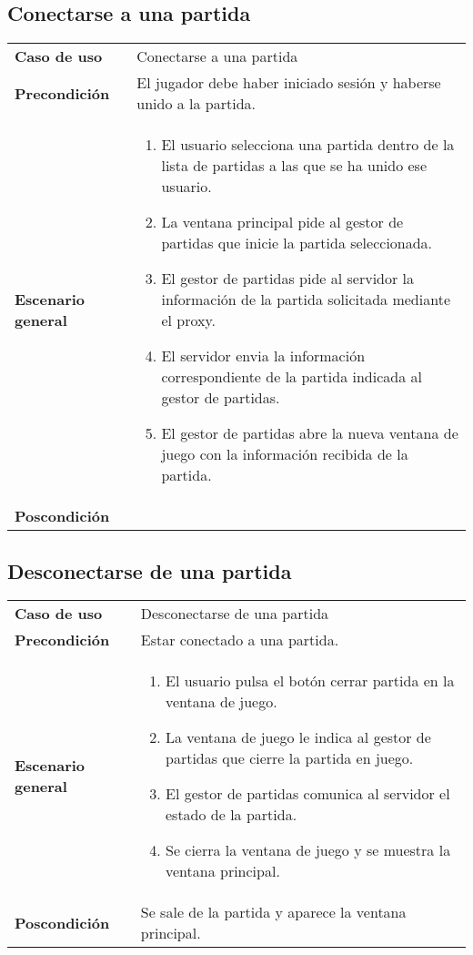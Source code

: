\subsection{Conectarse a una partida}
{\footnotesize
\begin{tabularx}{0.95\textwidth}{p{}|X}

\textbf{Caso de uso} & Conectarse a una partida \\

\textbf{Precondición} & El jugador debe haber iniciado sesión y haberse unido a
la partida.\\

\textbf{Escenario general} & \begin{enumerate}
\item El usuario selecciona una partida dentro de la lista de partidas a las que
se ha unido ese usuario.
\item La ventana principal pide al gestor de partidas que inicie la partida
seleccionada.
\item El gestor de partidas pide al servidor la información de la partida
solicitada mediante el proxy.
\item El servidor envia la información correspondiente de la partida indicada al
gestor de partidas.
\item El gestor de partidas abre la nueva ventana de juego con la información
recibida de la partida.

\end{enumerate} \\

\textbf{Poscondición}

\end{tabularx}
}

\subsection{Desconectarse de una partida}
{\footnotesize
\begin{tabularx}{0.95\textwidth}{p{}|X}

\textbf{Caso de uso} & Desconectarse de una partida \\

\textbf{Precondición} & Estar conectado a una partida.\\

\textbf{Escenario general} & \begin{enumerate}
\item El usuario pulsa el botón cerrar partida en la ventana de juego.
\item La ventana de juego le indica al gestor de partidas que cierre la partida
en juego.
\item El gestor de partidas comunica al servidor el estado de la partida.
\item Se cierra la ventana de juego y se muestra la ventana principal.

\end{enumerate} \\

\textbf{Poscondición} & Se sale de la partida y aparece la ventana principal.

\end{tabularx}
}

